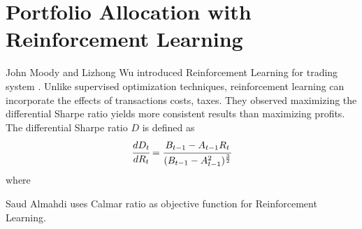 \section{Portfolio Allocation with Reinforcement Learning}

John Moody and Lizhong Wu introduced Reinforcement Learning for trading system \cite{618952}. Unlike supervised optimization techniques, reinforcement learning can incorporate the effects of transactions costs, taxes. They observed maximizing the differential Sharpe ratio yields more consistent results than maximizing profits.\cite{618952,moody1998performance} The differential Sharpe ratio \(D\) is defined as
\[
\cfrac{d D_t}{d R_t} = 
\cfrac{B_{t-1}-A_{t-1} R_t}{(B_{t-1}-A_{t-1}^2)^\frac{3}{2}}
\]
where

\cite{DEMPSTER2006543}
Saud Almahdi uses Calmar ratio as objective function for Reinforcement Learning. \cite{AdaptivePortfolioTradingSystem}